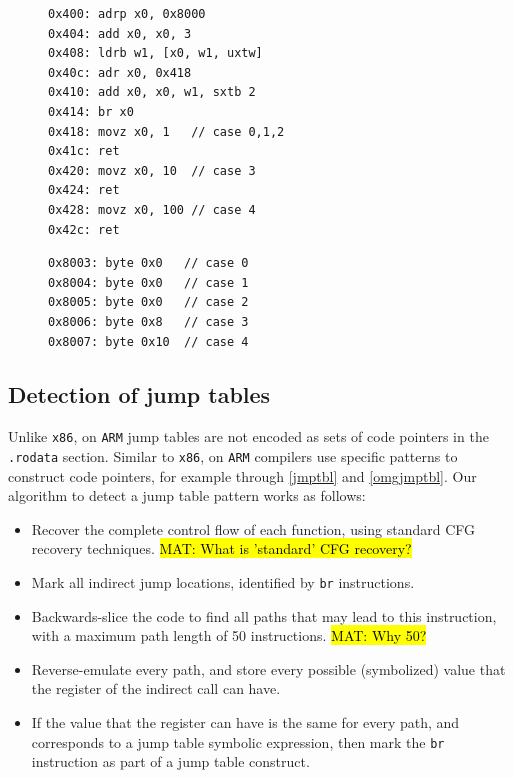 \documentclass[a4paper,11pt,oneside]{report}
\DeclareRobustCommand{\mat}[1]{{\sethlcolor{red}\hl{MAT: #1}}}
\begin{document}
\begin{figure}[h]
\begin{minipage}{.50\textwidth}
\begin{lstlisting}[basicstyle=\ttfamily\small,numbers=none]
0x400: adrp x0, 0x8000
0x404: add x0, x0, 3
0x408: ldrb w1, [x0, w1, uxtw]
0x40c: adr x0, 0x418
0x410: add x0, x0, w1, sxtb 2
0x414: br x0
0x418: movz x0, 1   // case 0,1,2
0x41c: ret
0x420: movz x0, 10  // case 3
0x424: ret
0x428: movz x0, 100 // case 4
0x42c: ret
\end{lstlisting}
\end{minipage}\hfill
\begin{minipage}{.45\textwidth}
\begin{lstlisting}[basicstyle=\ttfamily\small,numbers=none]
0x8003: byte 0x0   // case 0
0x8004: byte 0x0   // case 1
0x8005: byte 0x0   // case 2
0x8006: byte 0x8   // case 3
0x8007: byte 0x10  // case 4
\end{lstlisting}
\end{minipage}
\label{omgjmptbl}
\end{figure}



\subsection{Detection of jump tables}
Unlike \texttt{x86}, on \texttt{ARM} jump tables are not encoded as sets of code
pointers in the \texttt{.rodata} section.
Similar to \texttt{x86}, on \texttt{ARM} compilers use specific patterns to construct
code pointers, for example through
\autoref{jmptbl} and \autoref{omgjmptbl}. 
Our algorithm to detect a jump table pattern works as follows:

\begin{itemize}
	\item Recover the complete control flow of each function, using standard CFG recovery techniques.
	\mat{What is 'standard' CFG recovery?}
	\item Mark all indirect jump locations, identified by \texttt{br} instructions.
	\item Backwards-slice the code to find all paths that may lead to
		this instruction, with a maximum path length of 50 instructions.
		\mat{Why 50?}
	\item Reverse-emulate every path, and store every possible (symbolized)
		value that the register of the indirect call can have.
	\item If the value that the register can have is the same for every path,
		and corresponds to a jump table symbolic expression, then mark the
		\texttt{br} instruction as part of a jump table construct.
\end{itemize}
\end{document}
